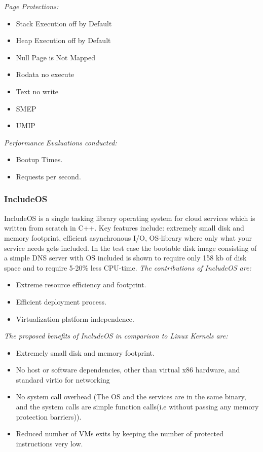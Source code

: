 \emph{Page Protections:}

\begin{itemize}
  \item Stack Execution off by Default
  \item Heap Execution off by Default
  \item Null Page is Not Mapped
  \item Rodata no execute
  \item Text no write
\end{itemize}

\begin{itemize}
  \item SMEP
  \item UMIP
\end{itemize}

\emph{Performance Evaluations conducted:}
\begin{itemize}
  \item Bootup Times.
  \item Requests per second.
\end{itemize}

\subsubsection{IncludeOS}
IncludeOS\cite{IncludeOS} is a single tasking library operating system for 
cloud services which is written from scratch in C++. Key features include:
extremely small disk and memory footprint, efficient asynchronous I/O, 
OS-library where only what your service needs gets included.
In the test case the bootable disk image consisting
of a simple DNS server with OS included is shown
to require only 158 kb of disk space and to require
5-20\% less CPU-time.
\emph{The contributions of IncludeOS are:}
\begin{itemize}
  \item Extreme resource efficiency and footprint.
  \item Efficient deployment process.
  \item Virtualization platform independence.
\end{itemize}
\emph{The proposed benefits of IncludeOS  in comparison to Linux Kernels are:}
\begin{itemize}
  \item Extremely small disk and memory footprint.
  \item No host or software dependencies, other than
  virtual x86 hardware, and standard virtio for
  networking
  \item No system call overhead (The OS and the
  services are in the same binary, and the system calls
  are simple function calls(i.e without passing any
  memory protection barriers)).
  \item Reduced number of VMs exits by keeping the
  number of protected instructions very low.
\end{itemize}

